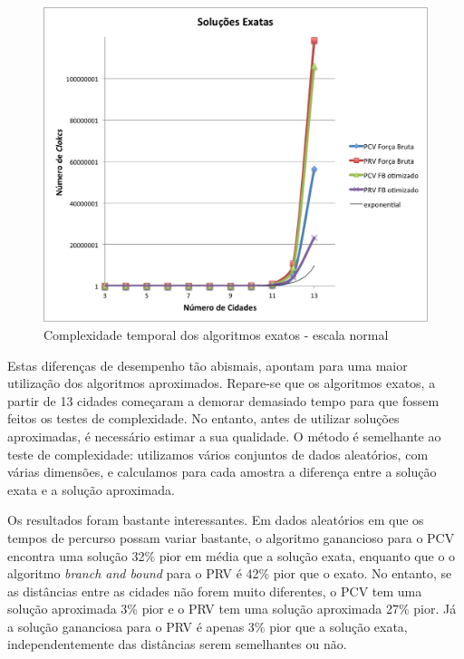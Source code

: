 \documentclass[12pt,a4paper,reqno]{report}
\numberwithin{equation}{section}
\begin{document}
\begin{figure} [ht]
\begin{center}
\includegraphics[width=15cm]{exact2.png}
\caption{Complexidade temporal dos algoritmos exatos - escala normal}
\label{exact2}
\end{center}
\end{figure}

Estas diferenças de desempenho tão abismais, apontam para uma maior utilização dos algoritmos aproximados. Repare-se que os algoritmos exatos, a partir de 13 cidades começaram a demorar demasiado tempo para que fossem feitos os testes de complexidade. No entanto, antes de utilizar soluções aproximadas, é necessário estimar a sua qualidade. O método é semelhante ao teste de complexidade: utilizamos vários conjuntos de dados aleatórios, com várias dimensões, e calculamos para cada amostra a diferença entre a solução exata e a solução aproximada.

Os resultados foram bastante interessantes. Em dados aleatórios em que os tempos de percurso possam variar bastante, o algoritmo ganancioso para o PCV encontra uma solução 32\% pior em média que a solução exata, enquanto que o o algoritmo \emph{branch and bound} para o PRV é 42\% pior que o exato. No entanto, se as distâncias entre as cidades não forem muito diferentes, o PCV tem uma solução aproximada 3\% pior e o PRV tem uma solução aproximada 27\% pior. Já a solução gananciosa para o PRV é apenas 3\% pior que a solução exata, independentemente das distâncias serem semelhantes ou não.
\end{document}
